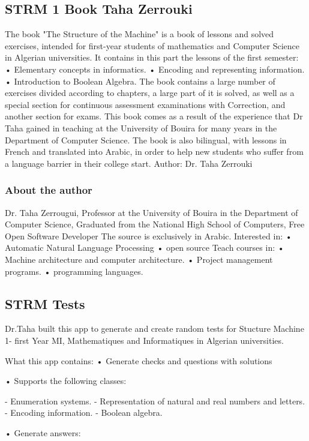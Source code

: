  \subsection{STRM 1 Book Taha Zerrouki}
 The book "The Structure of the Machine" is a book of lessons and solved exercises, intended for first-year students of mathematics and  Computer Science in 
 Algerian universities.\cite{STRM-1-Book-Taha-Zerrouki}
 It contains in this part the lessons of the first semester:
 • Elementary concepts in informatics.
 • Encoding and representing information.
 • Introduction to Boolean Algebra.
 The book contains a large number of exercises divided according to chapters, a large part of it is solved, as well as a special section for continuous assessment examinations with
 Correction, and another section for exams.
 This book comes as a result of the experience that Dr Taha gained in teaching at the University of Bouira for many years in the Department of Computer Science.
 The book is also bilingual, with lessons in French and translated into Arabic, in order to help new students who suffer from a language barrier in their college start.
 Author: Dr. Taha Zerrouki
 \subsubsection{About the author}
 Dr. Taha Zerrougui, Professor at the University of Bouira in the Department of Computer Science, Graduated from the National High School of Computers, Free Open Software Developer
 The source is exclusively in Arabic. 
 Interested in:
 • Automatic Natural Language Processing
 • open source
 Teach courses in:
 • Machine architecture and computer architecture.
 • Project management programs.
 • programming languages.
 
 \subsection{STRM Tests}
 Dr.Taha built this app to generate and create random tests for Stucture Machine 1- first Year MI, Mathematiques and Informatiques
  in Algerian universities.\cite{STRM-Tests}
 
 What this app contains:
 • Generate checks and questions with solutions
 
 • Supports the following classes:
 
 - Enumeration systems.
 - Representation of natural and real numbers and letters.
 - Encoding information.
 - Boolean algebra.
 
 • Generate answers:
 
